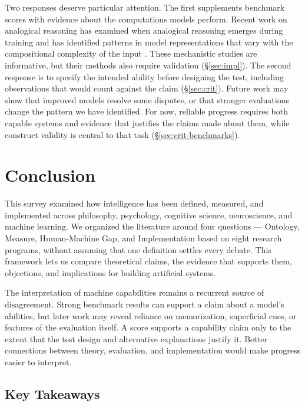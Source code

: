 \documentclass[acmsmall,screen,review,anonymous]{acmart}
\begin{document}
Two responses deserve particular attention.
%
The first supplements benchmark scores with evidence about the computations models perform.
%
Recent work on analogical reasoning has examined when analogical reasoning emerges during training \citep{minegishi2026emergentanalogicalreasoningtransformers} and has identified patterns in model representations that vary with the compositional complexity of the input \citep{pmlr-v267-yang25c, lee-etal-2025-geometric}. 
%
These mechanistic studies are informative, but their methods also require validation (\S\ref{sec:impl}).
%
The second response is to specify the intended ability before designing the test, including observations that would count against the claim (\S\ref{sec:crit}).
%
Future work may show that improved models resolve some disputes, or that stronger evaluations change the pattern we have identified.
%
For now, reliable progress requires both capable systems and evidence that justifies the claims made about them, while construct validity is central to that task (\S\ref{sec:crit-benchmarks}).





\section{Conclusion}
%
\label{sec:conc}
This survey examined how intelligence has been defined, measured, and implemented across philosophy, psychology, cognitive science, neuroscience, and machine learning.
%
We organized the literature around four questions --- Ontology, Measure, Human-Machine Gap, and Implementation based on eight research programs, without assuming that one definition settles every debate.
%
This framework lets us compare theoretical claims, the evidence that supports them, objections, and implications for building artificial systems.

The interpretation of machine capabilities remains a recurrent source of disagreement.
%
Strong benchmark results can support a claim about a model's abilities, but later work may reveal reliance on memorization, superficial cues, or features of the evaluation itself.
%
A score supports a capability claim only to the extent that the test design and alternative explanations justify it.
%
Better connections between theory, evaluation, and implementation would make progress easier to interpret.

\subsection{Key Takeaways}
\end{document}
